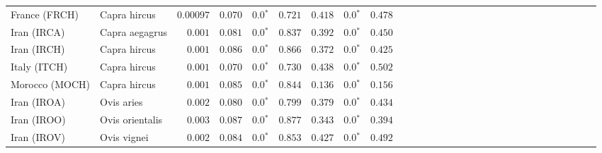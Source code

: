 \begin{center}
\begin{adjustbox}{width = 1\textwidth}
\begin{tabular}{|l|l|r|r|r|r|r|r|r|r|r|r|r|r|r|r|r|r|r|r|r|r|r|r|r|r|r|r|r|}
                  France (FRCH) &         Capra hircus &          $0.00097$ &                      $ 0.070$ &                  $\bm{0.0{^*}}$ &                                           $ 0.721$ &                      $ 0.418$ &                  $\bm{0.0{^*}}$ &                                           $ 0.478$ \\
                    Iran (IRCA) &       Capra aegagrus &           $ 0.001$ &                      $ 0.081$ &                  $\bm{0.0{^*}}$ &                                           $ 0.837$ &                      $ 0.392$ &                  $\bm{0.0{^*}}$ &                                           $ 0.450$ \\
                    Iran (IRCH) &         Capra hircus &           $ 0.001$ &                      $ 0.086$ &                  $\bm{0.0{^*}}$ &                                           $ 0.866$ &                      $ 0.372$ &                  $\bm{0.0{^*}}$ &                                           $ 0.425$ \\
                   Italy (ITCH) &         Capra hircus &           $ 0.001$ &                      $ 0.070$ &                  $\bm{0.0{^*}}$ &                                           $ 0.730$ &                      $ 0.438$ &                  $\bm{0.0{^*}}$ &                                           $ 0.502$ \\
                 Morocco (MOCH) &         Capra hircus &           $ 0.001$ &                      $ 0.085$ &                  $\bm{0.0{^*}}$ &                                           $ 0.844$ &                      $ 0.136$ &                  $\bm{0.0{^*}}$ &                                           $ 0.156$ \\
                    Iran (IROA) &           Ovis aries &           $ 0.002$ &                      $ 0.080$ &                  $\bm{0.0{^*}}$ &                                           $ 0.799$ &                      $ 0.379$ &                  $\bm{0.0{^*}}$ &                                           $ 0.434$ \\
                    Iran (IROO) &      Ovis orientalis &           $ 0.003$ &                      $ 0.087$ &                  $\bm{0.0{^*}}$ &                                           $ 0.877$ &                      $ 0.343$ &                  $\bm{0.0{^*}}$ &                                           $ 0.394$ \\
                    Iran (IROV) &          Ovis vignei &           $ 0.002$ &                      $ 0.084$ &                  $\bm{0.0{^*}}$ &                                           $ 0.853$ &                      $ 0.427$ &                  $\bm{0.0{^*}}$ &                                           $ 0.492$ \\

\end{tabular}
\end{adjustbox}
\end{center}
